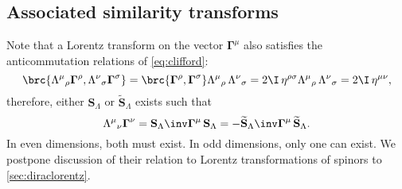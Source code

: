 \documentclass[11pt]{article}
\newcommand{\Gammab}{\boldsymbol{\Gamma}}
\renewcommand{\S}{\mathbf{S}}
\newcommand{\St}{\widetilde{\S}}
\begin{document}


\subsection{Associated similarity transforms}\label{sec:simlorentz}

Note that a Lorentz transform on the vector \(\Gammab^\mu\) also satisfies the anticommutation relations of \cref{eq:clifford}:
%
\begin{equation*}
  \brc{\Lambda^\mu{}_\rho \Gammab^\rho, \Lambda^\nu{}_\sigma \Gammab^\sigma}
    = \brc{\Gammab^\rho, \Gammab^\sigma} \Lambda^\mu{}_\rho\, \Lambda^\nu{}_\sigma
    = 2 \I\, \eta^{\rho\sigma} \Lambda^\mu{}_\rho\, \Lambda^\nu{}_\sigma
    = 2 \I\, \eta^{\mu\nu},
\end{equation*}
%
therefore, either \(\S_\Lambda\) or \(\St_\Lambda\) exists such that
%
\begin{equation}\label{eq:spinlorentz}
  \Lambda^\mu{}_\nu \Gammab^\nu = \S_\Lambda\inv \Gammab^\mu\, \S_\Lambda
  = - \St_\Lambda\inv \Gammab^\mu\, \St_\Lambda.
\end{equation}
%
In even dimensions, both must exist.
In odd dimensions, only one can exist.
We postpone discussion of their relation to Lorentz transformations of spinors to \cref{sec:diraclorentz}.
\end{document}
